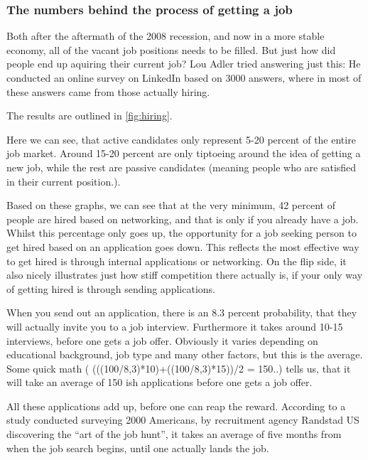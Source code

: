 \subsubsection{The numbers behind the process of getting a job}
Both after the aftermath of the 2008 recession, and now in a more stable
economy, all of the vacant job positions needs to be
filled. But just how did people end up aquiring their current job?
Lou Adler tried answering just this: He conducted an online survey
on LinkedIn based on 3000 answers, where in most of these answers
came from those actually hiring.

The results are outlined in \vref{fig:hiring}.

Here we can see, that active candidates only represent 5-20 percent of the
entire job market. Around 15-20 percent are only tiptoeing around the idea
of getting a new job, while the rest are passive candidates (meaning people who are
satisfied in their current position.).

Based on these graphs, we can see that at the very minimum, 42 percent of people are
hired based on networking, and that is only if you already have a job.
Whilst this percentage only goes up, the opportunity for a job seeking person
to get hired based on an application goes down. This reflects the
most effective way to get hired is through internal applications or networking.
On the flip side, it also nicely illustrates just how stiff competition there actually is,
if your only way of getting hired is through sending applications.

When you send out an application, there is an 8.3 percent probability, that
they will actually invite you to a job interview. Furthermore it takes around
10-15 interviews, before one gets a job offer. Obviously it varies depending
on educational background, job type and many other factors, but this is the average.
Some quick math ( (((100/8,3)*10)+((100/8,3)*15))/2 = 150..) tells us, that it will
take an average of 150 ish applications before one gets a job offer.

All these applications add up, before one can reap the reward. According to a
study conducted surveying 2000 Americans, by recruitment agency Randstad US
discovering the “art of the job hunt”, it takes an average of five
months from when the job search begins, until one actually lands
the job.

